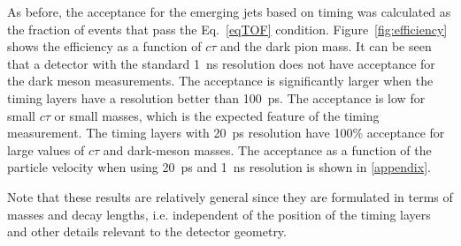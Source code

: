 As before, the acceptance for the emerging jets based on timing was calculated as the fraction of events that pass the 
Eq.~\ref{eqTOF} condition. Figure~\ref{fig:efficiency} shows the efficiency
as a function of $c\tau$ and the dark pion mass. It can be seen that a detector with the standard 1~ns resolution does
not have acceptance for the dark meson measurements. The acceptance is significantly larger when the timing layers 
 have a resolution better than 100~ps.
The acceptance is low for small $c\tau$ or small masses, which is the expected feature of the timing measurement.
The timing layers with 20~ps resolution have 100\% acceptance for large values of $c\tau$ and dark-meson masses.
The acceptance as a function of the particle velocity when using 20~ps and 1~ns resolution 
is shown in \ref{appendix}.

Note that these results are relatively general since they are formulated in terms of masses and decay lengths,  
i.e. independent of the position of the timing layers and other details relevant to 
the detector geometry.


